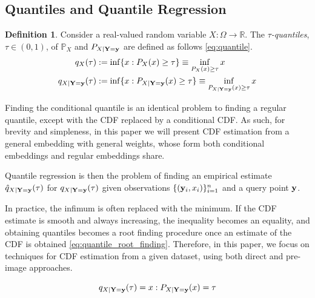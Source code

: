 \documentclass[twoside]{article} \usepackage{aistats2017}
\theoremstyle{definition}
\newtheorem{definition}{Definition}[section]
\theoremstyle{theorem}
\newcommand{\rv}[1]{{#1}}
\begin{document}
	\subsection{Quantiles and Quantile Regression}
	\label{sec:background:quantiles}

		\begin{definition} \label{def:quantile}
			\citep{takeuchi2006nonparametric}
			Consider a real-valued random variable $\rv{X} : \Omega \to \mathbb{R}$. The \textit{$\tau$-quantiles}, $\tau \in (0, 1)$, of $\mathbb{P}_{\rv{X}}$ and $P_{\rv{X} | \bvec{\rv{Y}} = \bvec{y}}$ are defined as follows \eqref{eq:quantile}.
			\begin{equation}
				\begin{aligned}
					q_{\rv{X}}(\tau) &:= \inf\{x : P_{\rv{X}}(x) \geq \tau\} \equiv \inf_{P_{\rv{X}}(x) \geq \tau} x \\
					q_{\rv{X} | \bvec{\rv{Y}} = \bvec{y}}(\tau) &:= \inf\{x : P_{\rv{X} | \bvec{\rv{Y}} = \bvec{y}}(x) \geq \tau\} \equiv \inf_{P_{\rv{X} | \bvec{\rv{Y}} = \bvec{y}}(x) \geq \tau} x
				\end{aligned}
			\label{eq:quantile}
			\end{equation}
		\end{definition}

		Finding the conditional quantile is an identical problem to finding a regular quantile, except with the CDF replaced by a conditional CDF. As such, for brevity and simpleness, in this paper we will present CDF estimation from a general embedding with general weights, whose form both conditional embeddings and regular embeddings share.

		Quantile regression is then the problem of finding an empirical estimate $\hat{q}_{\rv{X} | \bvec{\rv{Y}} = \bvec{y}}(\tau)$ for $q_{\rv{X} | \bvec{\rv{Y}} = \bvec{y}}(\tau)$ given observations $\{(\mathbf{y}_{i}, x_{i})\}_{i = 1}^{n}$ and a query point $\mathbf{y}$.
		
		In practice, the infimum is often replaced with the minimum. If the CDF estimate is smooth and always increasing, the inequality becomes an equality, and obtaining quantiles becomes a root finding procedure once an estimate of the CDF is obtained \eqref{eq:quantile_root_finding}. Therefore, in this paper, we focus on techniques for CDF estimation from a given dataset, using both direct and pre-image approaches.
		
		\begin{equation}
			q_{\rv{X} | \bvec{\rv{Y}} = \bvec{y}}(\tau) = x : P_{\rv{X} | \bvec{\rv{Y}} = \bvec{y}}(x) = \tau
		\label{eq:quantile_root_finding}
		\end{equation}	
	
\end{document}
